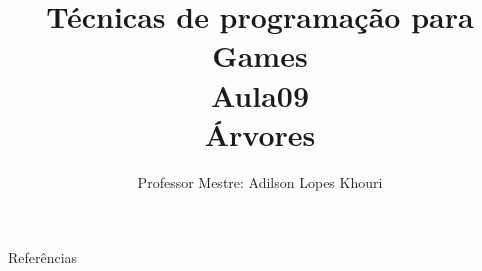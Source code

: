 \documentclass[compress, hyperref={pdfpagelayout=SinglePage}]{beamer}
\title[AED - Aula 09]{Técnicas de programação para Games \\ Aula09 \\ Árvores}
\author{Professor Mestre: Adilson Lopes Khouri}
\begin{document}
	\begin{frame}
		\titlepage
	\end{frame}
	
	
	
	
	
	
	
	

	

	\begin{frame}[allowframebreaks]{Referências}
			\tiny
			\nocite{*}
			
	    		
	\end{frame}
\end{document}
